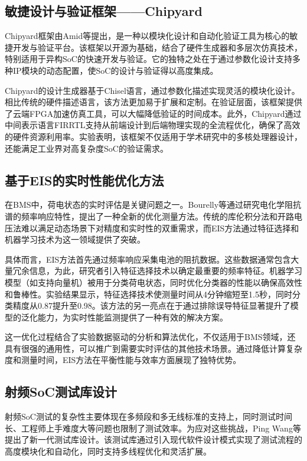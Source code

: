 \documentclass[12pt,hyperref,a4paper,UTF8]{ctexart}
\begin{document}
\subsection{敏捷设计与验证框架——Chipyard}
Chipyard框架由Amid等提出，是一种以模块化设计和自动化验证工具为核心的敏捷开发与验证平台\cite{9099108}。该框架以开源为基础，结合了硬件生成器和多层次仿真技术，特别适用于异构SoC的快速开发与验证。它的独特之处在于通过参数化设计支持多种IP模块的动态配置，使SoC的设计与验证得以高度集成。

Chipyard的设计生成器基于Chisel语言，通过参数化描述实现灵活的模块化设计。相比传统的硬件描述语言，该方法更加易于扩展和定制。在验证层面，该框架提供了云端FPGA加速仿真工具，可以大幅降低验证的时间成本。此外，Chipyard通过中间表示语言FIRRTL支持从前端设计到后端物理实现的全流程优化，确保了高效的硬件资源利用率。实验表明，该框架不仅适用于学术研究中的多核处理器设计，还能满足工业界对高复杂度SoC的验证需求\cite{9099108}。

\subsection{基于EIS的实时性能优化方法}
在BMS中，荷电状态的实时评估是关键问题之一。Bourelly等通过研究电化学阻抗谱的频率响应特性，提出了一种全新的优化测量方法\cite{10227269}。传统的库伦积分法和开路电压法难以满足动态场景下对精度和实时性的双重需求，而EIS方法通过特征选择和机器学习技术为这一领域提供了突破。

具体而言，EIS方法首先通过频率响应采集电池的阻抗数据。这些数据通常包含大量冗余信息，为此，研究者引入特征选择技术以确定最重要的频率特征。机器学习模型（如支持向量机）被用于分类荷电状态，同时优化分类器的性能以确保高效性和鲁棒性。实验结果显示，特征选择技术使测量时间从4分钟缩短至1.5秒，同时分类精度从0.87提升至0.98。该方法的另一亮点在于通过排除误导特征显著提升了模型的泛化能力，为实时性能监测提供了一种有效的解决方案。

这一优化过程结合了实验数据驱动的分析和算法优化，不仅适用于BMS领域，还具有很强的通用性，可以推广到需要实时评估的其他技术场景。通过降低计算复杂度和测量时间，EIS方法在平衡性能与效率方面展现了独特优势。

\subsection{射频SoC测试库设计}
射频SoC测试的复杂性主要体现在多频段和多无线标准的支持上，同时测试时间长、工程师上手难度大等问题也限制了测试效率。为应对这些挑战，Ping Wang等提出了新一代测试库设计\cite{9461580}。该测试库通过引入现代软件设计模式实现了测试流程的高度模块化和自动化，同时支持多线程优化和灵活扩展。
\end{document}
